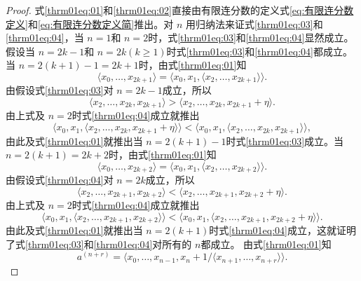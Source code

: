 \begin{proof}
	式\eqref{thrm01eq:01}和\eqref{thrm01eq:02}直接由有限连分数的定义式\eqref{eq:有限连分数定义}和\eqref{eq:有限连分数定义简}推出。对
	\( n \) 用归纳法来证式\eqref{thrm01eq:03}和\eqref{thrm01eq:04}，当 \( n=1 \)和 \( n=2
	\)时，式\eqref{thrm01eq:03}和\eqref{thrm01eq:04}显然成立。假设当 \( n=2k-1 \)和 \( n=2k (k \geqslant
	1)\)时式\eqref{thrm01eq:03}和\eqref{thrm01eq:04}都成立。当 \( n=2(k+1)-1=2k+1 \)时，由式\eqref{thrm01eq:01}知
	\begin{equation*}
		\langle x_0, \dots, x_{2k+1} \rangle = \langle x_0, x_1, \langle x_2, \dots, x_{2k+1} \rangle\rangle.
	\end{equation*}
	由假设式\eqref{thrm01eq:03}对 \( n = 2k -1 \)成立，所以
	\begin{equation*}
		\langle x_2, \dots, x_{2k}, x_{2k+1} \rangle > \langle x_2, \dots, x_{2k}, x_{2k+1} + \eta \rangle.
	\end{equation*}
	由上式及 \( n=2 \)时式\eqref{thrm01eq:04}成立就推出
	\begin{equation*}
		\langle x_0, x_1, \langle x_2, \dots, x_{2k}, x_{2k+1} + \eta \rangle\rangle < \langle x_0, x_1, \langle
		x_2, \dots, x_{2k}, x_{2k+1} \rangle\rangle,
	\end{equation*}
	由此及式\eqref{thrm01eq:01}就推出当 \( n=2(k+1) - 1 \)时式\eqref{thrm01eq:03}成立。当 \( n=2(k+1) = 2k + 2
	\)时，由式\eqref{thrm01eq:01}知
	\begin{equation*}
		\langle x_0, \dots, x_{2k+2} \rangle = \langle x_0, x_1, \langle x_2, \dots, x_{2k+2}\rangle\rangle.
	\end{equation*}
	由假设式\eqref{thrm01eq:04}对 \( n=2k \)成立，所以
	\begin{equation*}
		\langle x_2, \dots, x_{2k+1}, x_{2k+2} \rangle < \langle x_2, \dots, x_{2k+1}, x_{2k+2} + \eta \rangle.
	\end{equation*}
	由上式及 \( n=2 \)时式\eqref{thrm01eq:04}成立就推出
	\begin{equation*}
		\langle x_0, x_1, \langle x_2, \dots, x_{2k+1}, x_{2k+2} \rangle\rangle < \langle x_0, x_1, \langle x_2,
		\dots, x_{2k+1}, x_{2k+2} + \eta\rangle\rangle.
	\end{equation*}
	由此及式\eqref{thrm01eq:01}就推出当 \( n=2(k+1)
	\)时式\eqref{thrm01eq:04}成立，这就证明了式\eqref{thrm01eq:03}和\eqref{thrm01eq:04}对所有的 \( n \)都成立。
	由式\eqref{thrm01eq:01}知
	\begin{equation*}
		a^{(n+r)} = \langle x_0, \dots, x_{n-1}, x_{n} + 1/\langle x_{n+1}, \dots, x_{n+r}\rangle\rangle.

\end{equation*}
\end{proof}
